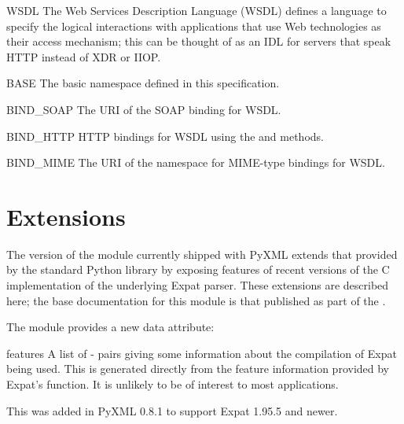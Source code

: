 \documentclass{howto}
\begin{document}
\begin{classdesc*}{WSDL}
  The Web Services Description Language (WSDL) defines a language to
  specify the logical interactions with applications that use Web
  technologies as their access mechanism; this can be thought of as an
  IDL for servers that speak HTTP instead of XDR or IIOP.

  \begin{memberdesc}{BASE}
    The basic namespace defined in this specification.
  \end{memberdesc}

  \begin{memberdesc}{BIND_SOAP}
    The URI of the SOAP binding for WSDL.
  \end{memberdesc}

  \begin{memberdesc}{BIND_HTTP}
    HTTP bindings for WSDL using the  and 
    methods.
  \end{memberdesc}

  \begin{memberdesc}{BIND_MIME}
    The URI of the namespace for MIME-type bindings for WSDL.
  \end{memberdesc}
\end{classdesc*}


\section{ Extensions}

The version of the  module currently shipped
with PyXML extends that provided by the standard Python library by
exposing features of recent versions of the C implementation of the
underlying Expat parser.  These extensions are described here; the
base documentation for this module is that published as part of the
.

The module provides a new data attribute:

\begin{datadesc}{features}
  A list of - pairs giving some information about
  the compilation of Expat being used.  This is generated directly
  from the feature information provided by Expat's
   function.  It is unlikely to be of
  interest to most applications.

  This was added in PyXML 0.8.1 to support Expat 1.95.5 and newer.
\end{datadesc}
\end{document}
